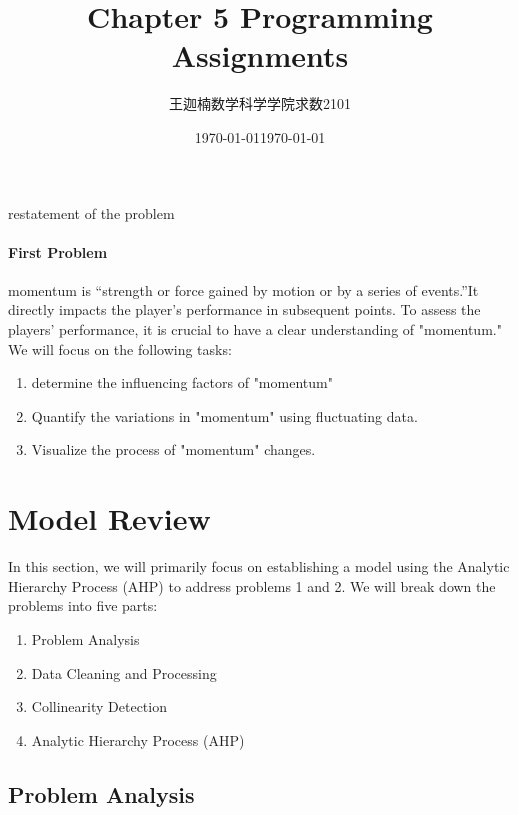 \documentclass[12pt, a4paper, oneside]{article}
\date{\today}
\title{Chapter 5 Programming Assignments}
\author{王迦楠\quad 数学科学学院\quad 求数2101\quad 3210105175}
\date{\today}
\theoremstyle{break}
\begin{document}
\maketitle

restatement of the problem

\paragraph{First Problem}
momentum is “strength or force gained by motion or by a series of 
events.”It directly impacts the player's performance in subsequent points.
To assess the players' performance, it is crucial to have a clear understanding of "momentum." 
We will focus on the following tasks: 
 \begin{enumerate}
    \item determine the influencing factors of "momentum" 
    \item Quantify the variations in "momentum" using fluctuating data.
    \item Visualize the process of "momentum" changes.
\end{enumerate}
 
\section{Model Review}

In this section, we will primarily focus on establishing a model using the Analytic Hierarchy Process (AHP) to address problems 1 and 2. We will break down the problems into five parts:
\begin{enumerate}
\item Problem Analysis
\item Data Cleaning and Processing
\item Collinearity Detection
\item Analytic Hierarchy Process (AHP)
\end{enumerate}

\subsection{Problem Analysis}
\end{document}

